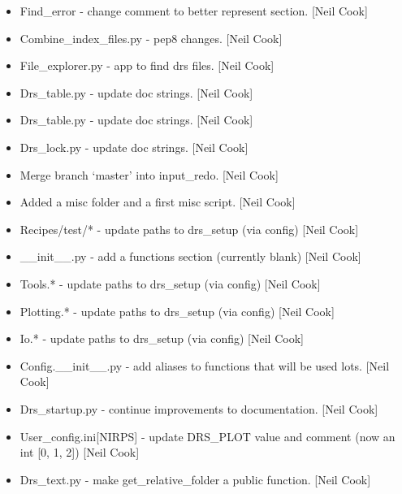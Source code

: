 \documentclass[a4paper,10pt,english]{report}
\begin{document}
\begin{itemize}
\item {} 
Find\_error - change comment to better represent section. {[}Neil Cook{]}

\item {} 
Combine\_index\_files.py - pep8 changes. {[}Neil Cook{]}

\item {} 
File\_explorer.py - app to find drs files. {[}Neil Cook{]}

\item {} 
Drs\_table.py - update doc strings. {[}Neil Cook{]}

\item {} 
Drs\_table.py - update doc strings. {[}Neil Cook{]}

\item {} 
Drs\_lock.py - update doc strings. {[}Neil Cook{]}

\item {} 
Merge branch ‘master’ into input\_redo. {[}Neil Cook{]}

\item {} 
Added a misc folder and a first misc script. {[}Neil Cook{]}

\item {} 
Recipes/test/* - update paths to drs\_setup (via config) {[}Neil Cook{]}

\item {} 
\_\_init\_\_.py - add a functions section (currently blank) {[}Neil Cook{]}

\item {} 
Tools.* - update paths to drs\_setup (via config) {[}Neil Cook{]}

\item {} 
Plotting.* - update paths to drs\_setup (via config) {[}Neil Cook{]}

\item {} 
Io.* - update paths to drs\_setup (via config) {[}Neil Cook{]}

\item {} 
Config.\_\_init\_\_.py - add aliases to functions that will be used lots.
{[}Neil Cook{]}

\item {} 
Drs\_startup.py - continue improvements to documentation. {[}Neil Cook{]}

\item {} 
User\_config.ini{[}NIRPS{]} - update DRS\_PLOT value and comment (now an int
{[}0, 1, 2{]}) {[}Neil Cook{]}

\item {} 
Drs\_text.py - make get\_relative\_folder a public function. {[}Neil Cook{]}


\end{itemize}
\end{document}
